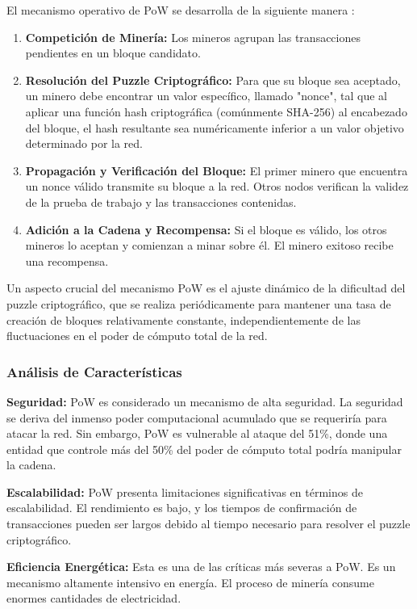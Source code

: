 \documentclass[spanish,12pt,letterpaper]{report}
\begin{document}
El mecanismo operativo de PoW se desarrolla de la siguiente manera \parencite{investopedia2025pow}:

\begin{enumerate}
    \item \textbf{Competición de Minería:} Los mineros agrupan las transacciones pendientes en un bloque candidato.
    \item \textbf{Resolución del Puzzle Criptográfico:} Para que su bloque sea aceptado, un minero debe encontrar un valor específico, llamado "nonce", tal que al aplicar una función hash criptográfica (comúnmente SHA-256) al encabezado del bloque, el hash resultante sea numéricamente inferior a un valor objetivo determinado por la red.
    \item \textbf{Propagación y Verificación del Bloque:} El primer minero que encuentra un nonce válido transmite su bloque a la red. Otros nodos verifican la validez de la prueba de trabajo y las transacciones contenidas.
    \item \textbf{Adición a la Cadena y Recompensa:} Si el bloque es válido, los otros mineros lo aceptan y comienzan a minar sobre él. El minero exitoso recibe una recompensa.
\end{enumerate}

Un aspecto crucial del mecanismo PoW es el ajuste dinámico de la dificultad del puzzle criptográfico, que se realiza periódicamente para mantener una tasa de creación de bloques relativamente constante, independientemente de las fluctuaciones en el poder de cómputo total de la red.

\subsubsection{Análisis de Características}

\textbf{Seguridad:} PoW es considerado un mecanismo de alta seguridad. La seguridad se deriva del inmenso poder computacional acumulado que se requeriría para atacar la red. Sin embargo, PoW es vulnerable al ataque del 51\%, donde una entidad que controle más del 50\% del poder de cómputo total podría manipular la cadena.

\textbf{Escalabilidad:} PoW presenta limitaciones significativas en términos de escalabilidad. El rendimiento es bajo, y los tiempos de confirmación de transacciones pueden ser largos debido al tiempo necesario para resolver el puzzle criptográfico.

\textbf{Eficiencia Energética:} Esta es una de las críticas más severas a PoW. Es un mecanismo altamente intensivo en energía. El proceso de minería consume enormes cantidades de electricidad.
\end{document}
